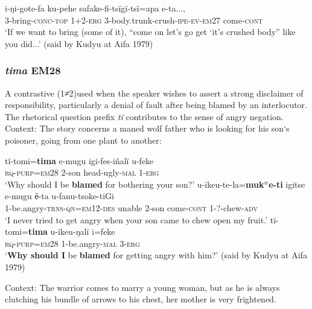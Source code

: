 \documentclass[output=paper]{langsci/langscibook}
\begin{document}
\begin{exe}
	\ex \label{ex:eb69}
	\gll i-ŋi-gote-fa ku-pehe safake-fi-tsïgï-tsï=apa e-ta...,\\
	3-bring-\textsc{conc-top} 1+2-\textsc{erg} 3-body.trunk-crush-\textsc{ipe-ev-\textsc{em}27} come-\textsc{cont}\\
	\trans `If we want to bring (some of it), “come on let’s go get ‘it’s crushed body” like you did...' (said by Kudyu at Aifa 1979)
\end{exe}

\subsubsection{\textit{tima} EM28}  
A contrastive (1≠2)used when the speaker wishes to assert a strong disclaimer of responsibility, particularly a denial of fault after being blamed by an interlocutor. The rhetorical question prefix \textit{tï} contributes to the sense of angry negation. Context: The story concerns a  maned wolf father who is looking for his son‘s poisoner,  going from one plant to another: 

\begin{exe}
\ex \label{ex:eb70}
	\begin{xlist}
	\ex \label{ex:eb70a}
	\gll tï-tomi=\textbf{tima} e-mugu igi-fes-iñalï u-feke\\
	\textsc{rq-purp=em28} 2-son head-ugly-\textsc{mal} 1-\textsc{erg}\\
	\trans ‘Why should I be \textbf{blamed} for bothering your son?’
	\ex \label{ex:eb70b}
	\gll u-ikeu-te-la=\textbf{muk$^w$e-ti} igitse e-mugu ё-ta u-fanu-tsoke-tiGi\\
	1-be.angry-\textsc{trns-qn=em12-des} unable 2-son come-\textsc{cont} 1-?-chew-\textsc{adv}\\
	\trans ‘I never tried to get angry when your son came to chew open my fruit.’
	\ex \label{ex:eb70c}
	\gll tï-tomi=\textbf{tima} u-ikeu-ŋalï i=feke\\
	\textsc{rq-purp=em28} 1-be.angry-\textsc{mal} 3-\textsc{erg}\\
	\trans ‘\textbf{Why should I} be \textbf{blamed} for getting angry with him?’ (said by Kudyu at Aifa 1979)
\end{xlist}
\end{exe}

Context: The warrior comes to marry a young woman, but as he is always clutching his bundle of arrows to his chest, her mother is very frightened.  
\end{document}

